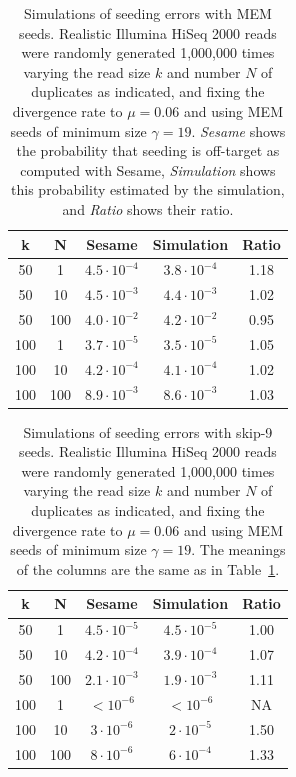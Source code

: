 \documentclass{article}
\begin{document}
\begin{table}
\renewcommand{\arraystretch}{1.1}
\centering
\begin{tabular}{ccccc}
k & N & Sesame & Simulation & Ratio \\
\hline
50  &  1  & $4.5 \cdot 10^{-4}$ & $3.8 \cdot 10^{-4}$ & 1.18 \\
50  & 10  & $4.5 \cdot 10^{-3}$ & $4.4 \cdot 10^{-3}$ & 1.02 \\
50  & 100 & $4.0 \cdot 10^{-2}$ & $4.2 \cdot 10^{-2}$ & 0.95 \\
100 &  1  & $3.7 \cdot 10^{-5}$ & $3.5 \cdot 10^{-5}$ & 1.05 \\
100 & 10  & $4.2 \cdot 10^{-4}$ & $4.1 \cdot 10^{-4}$ & 1.02 \\
100 & 100 & $8.9 \cdot 10^{-3}$ & $8.6 \cdot 10^{-3}$ & 1.03
\end{tabular}
\caption{Simulations of seeding errors with MEM seeds. Realistic Illumina
HiSeq 2000 reads were randomly generated 1,000,000 times varying the read
size $k$ and number $N$ of duplicates as indicated, and fixing the
divergence rate to $\mu = 0.06$ and using MEM seeds of minimum size
$\gamma=19$. \textit{Sesame} shows the probability that seeding is
off-target as computed with Sesame, \textit{Simulation} shows this
probability estimated by the simulation, and \textit{Ratio} shows their
ratio.}
\label{table_MEM_Illumina}
\end{table}

\begin{table}
\renewcommand{\arraystretch}{1.1}
\centering
\begin{tabular}{ccccc}
k & N & Sesame & Simulation & Ratio \\
\hline
50  &  1  & $4.5 \cdot 10^{-5}$ & $4.5 \cdot 10^{-5}$ & 1.00 \\
50  & 10  & $4.2 \cdot 10^{-4}$ & $3.9 \cdot 10^{-4}$ & 1.07 \\
50  & 100 & $2.1 \cdot 10^{-3}$ & $1.9 \cdot 10^{-3}$ & 1.11 \\
100 &  1  & $< 10^{-6}$         & $< 10^{-6}$         & NA   \\
100 & 10  & $3 \cdot 10^{-6}$   & $2 \cdot 10^{-5}$   & 1.50 \\
100 & 100 & $8 \cdot 10^{-6}$   & $6 \cdot 10^{-4}$   & 1.33
\end{tabular}
\caption{Simulations of seeding errors with skip-9 seeds. Realistic Illumina
HiSeq 2000 reads were randomly generated 1,000,000 times varying the read
size $k$ and number $N$ of duplicates as indicated, and fixing the
divergence rate to $\mu = 0.06$ and using MEM seeds of minimum size
$\gamma=19$. The meanings of the columns are the same as in
Table~\ref{table_MEM_Illumina}.}
\label{table_skip_Illumina}
\end{table}
\end{document}
